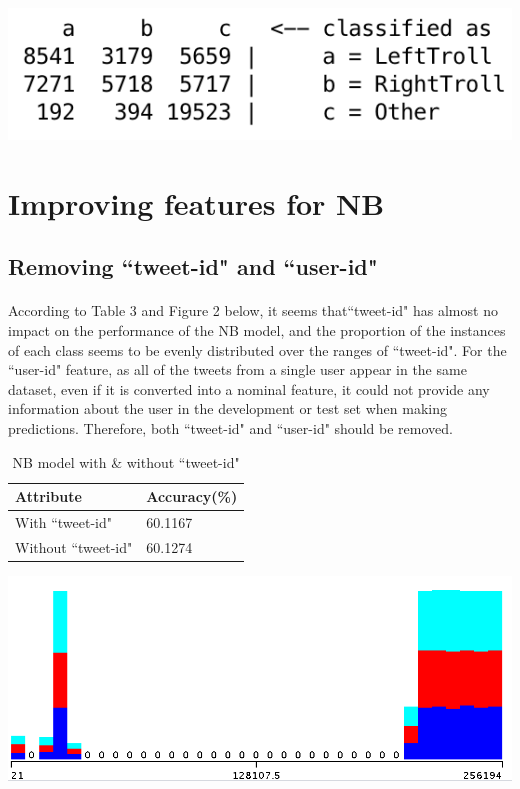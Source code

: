 \documentclass[11pt]{article}
\begin{document}
\includegraphics[scale=0.65]{"conf-matrix"}



\section{Improving features for NB}
\subsection{Removing ``tweet-id" and ``user-id"}

\paragraph{} According to Table 3 and Figure 2 below, it seems that``tweet-id" has almost no impact on the performance of the NB model, and the proportion of the instances of each class seems to be evenly distributed over the ranges of ``tweet-id". For the ``user-id" feature, as all of the tweets from a single user appear in the same dataset, even if it is converted into a nominal feature, it could not provide any information about the user in the development or test set when making predictions. Therefore, both ``tweet-id" and ``user-id" should be removed.

\begin{table}[!htbp]
 \begin{center}
\begin{tabular}{| l | l |}
      \hline
      Attribute & Accuracy(\%) \\
      \hline\hline
      With ``tweet-id" & 60.1167 \\
      Without ``tweet-id" & 60.1274 \\
      \hline
\end{tabular}
\caption{NB model with \& without ``tweet-id"}\label{table2}
 \end{center}
\end{table}

\includegraphics[scale=0.4]{"tid-class"}
\end{document}
